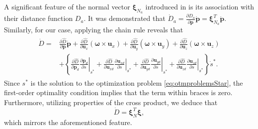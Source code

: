 A significant feature of the normal vector $\boldsymbol{\xi}_{N_a}$ introduced in \cite{Rezende2022} is its association with their distance function $D_a$. It was demonstrated that $\dot{D}_a = \frac{\partial D_a}{\partial \mathbf{p}}\dot{\mathbf{p}} = \boldsymbol{\xi}_{N_a}^T\dot{\mathbf{p}}$. Similarly, for our case, applying the chain rule reveals that
\begin{align}
\begin{split}
     \dot{D} = &\frac{\partial \widehat{D}}{\partial \mathbf{p}}\dot{\mathbf{p}} + \frac{\partial \widehat{D}}{\partial \mathbf{u}_x}(\boldsymbol{\omega}\times \mathbf{u}_x) + \frac{\partial \widehat{D}}{\partial \mathbf{u}_y}(\boldsymbol{\omega}\times \mathbf{u}_y)+ \frac{\partial \widehat{D}}{\partial \mathbf{u}_z}(\boldsymbol{\omega}\times \mathbf{u}_z) \\
     &+ \left\{ \frac{\partial \widehat{D}}{\partial \mathbf{p}_d}\left.\frac{\partial \mathbf{p}_d}{\partial s}\right|_{s^*}\!\!\!\! + \frac{\partial \widehat{D}}{\partial \mathbf{u}_{xd}}\left.\frac{\partial \mathbf{u}_{xd}}{\partial s}\right|_{s^*}\!\!\!\!
     + \frac{\partial \widehat{D}}{\partial \mathbf{u}_{yd}}\left.\frac{\partial \mathbf{u}_{yd}}{\partial s}\right|_{s^*}\!\!\!\! 
     + \frac{\partial \widehat{D}}{\partial \mathbf{u}_{zd}}\left.\frac{\partial \mathbf{u}_{zd}}{\partial s}\right|_{s^*}\right\}\dot{s}^{*}.
\end{split}
\end{align}
Since $s^*$ is the solution to the optimization problem \eqref{eq:otmproblemsStar}, the first-order optimality condition implies that the term within braces is zero. Furthermore, utilizing properties of the cross product, we deduce that
\begin{equation}
    \dot{D} = \boldsymbol{\xi}_N^T\boldsymbol{\xi}, \label{eq:keyfeaturenormal}
\end{equation}
which mirrors the aforementioned feature.

